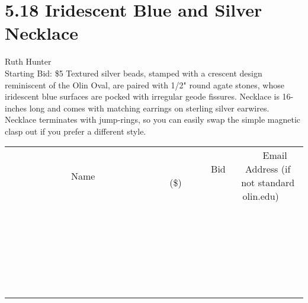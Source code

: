 \documentclass[11pt]{article}
\begin{document}
\section*{5.18 Iridescent Blue and Silver Necklace}
Ruth Hunter
\\
Starting Bid: \$5
\newline
Textured silver beads, stamped with a crescent design reminiscent of the Olin Oval, are paired with 1/2" round agate stones, whose iridescent blue surfaces are pocked with irregular geode fissures. Necklace is 16-inches long and comes with matching earrings on sterling silver earwires.  Necklace terminates with jump-rings, so you can easily swap the simple magnetic clasp out if you prefer a different style.
\\[6ex]
\begin{tabular}{c c c}
~~~~~~~~~~~~~Name~~~~~~~~~~~~~ & ~~~~~~~~~Bid (\$)~~~~~~~~~  & ~~~Email Address (if not standard olin.edu)~~~\\
 & & \\
\hline
 & & \\
\hline
 & & \\
\hline
 & & \\
\hline
 & & \\
\hline
 & & \\
\hline
 & & \\
\hline
 & & \\
\hline
 & & \\
\hline
 & & \\
\hline
 & & \\
\hline
 & & \\
\hline
 & & \\
\hline
 & & \\
\hline
 & & \\
\hline
 & & \\
\hline
 & & \\
\hline
 & & \\
\hline
 & & \\
\hline
 & & \\
\hline
 & & \\
\hline
 & & \\
\hline
 & & \\
\hline
 & & \\
\hline
 & & \\
\hline
 & & \\
\hline
\end{tabular}
\newpage
\end{document}
